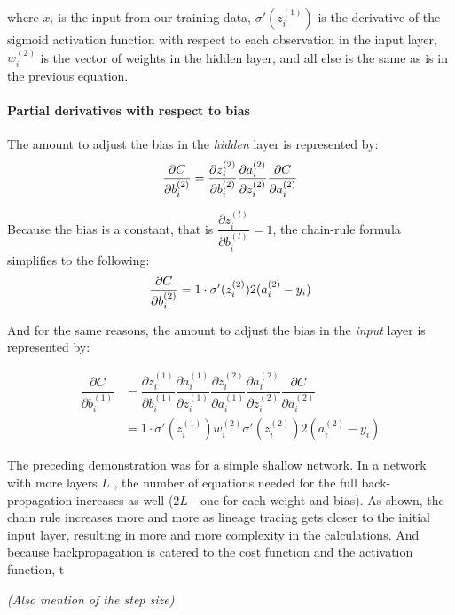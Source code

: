 where \(x_i\) is the input from our training data,
\(\sigma'(z_i^{(1)})\) is the derivative of the sigmoid activation
function with respect to each observation in the input layer,
\(w_i^{(2)}\) is the vector of weights in the hidden layer, and all else
is the same as is in the previous equation.


\hypertarget{partial-derivatives-with-respect-to-bias}{%
\paragraph{Partial derivatives with respect to
bias}\label{partial-derivatives-with-respect-to-bias}}

The amount to adjust the bias in the \emph{hidden} layer is
represented by: \[
\frac{\partial{C}}{\partial{b_i^{(2)}}}  =  \dfrac{\partial{z_i^{(2)}}}{\partial{b_i^{(2)}}}
     \dfrac{\partial{a_i^{(2)}}}{\partial{z_i^{(2)}}}
     \dfrac{\partial{C}}{\partial{a_i^{(2)}}} \\
\]

Because the bias is a constant, that is
\(\dfrac{\partial{z_i^{(l)}}}{\partial{b_i^{(l)}}} = 1\), the chain-rule
formula simplifies to the following: \[
\frac{\partial{C}}{\partial{b_i^{(2)}}} = 1 \cdot \sigma'(z_i^{(2)}) 2(a_i^{(2)}-y_i) \\
\]

And for the same reasons, the amount to adjust the bias in the \emph{input} layer is
represented by:

    \begin{align*}
\dfrac{\partial{C}}{\partial{b_i^{(1)}}} 
& = \dfrac{\partial{z_i^{(1)}}}{\partial{b_i^{(1)}}} \dfrac{\partial{a_i^{(1)}}}{\partial{z_i^{(1)}}}  \dfrac{\partial{z_i^{(2)}}}{\partial{a_i^{(1)}}}
     \dfrac{\partial{a_i^{(2)}}}{\partial{z_i^{(2)}}}
     \dfrac{\partial{C}}{\partial{a_i^{(2)}}} \\ \nonumber
& = 1 \cdot \sigma'(z_i^{(1)}) w_i^{(2)} \sigma'(z_i^{(2)}) 2(a_i^{(2)}-y_i) \nonumber
    \end{align*}


The preceding demonstration was for a simple shallow network.  In a network with more layers $L$ , the number of equations needed for the full back-propagation increases as well ($2L$ - one for each weight and bias).  As shown, the chain rule increases more and more as lineage tracing gets closer to the initial input layer, resulting in more and more complexity in the calculations.  And because backpropagation is catered to the cost function and the activation function, t

\textit{(Also mention of the step size)}